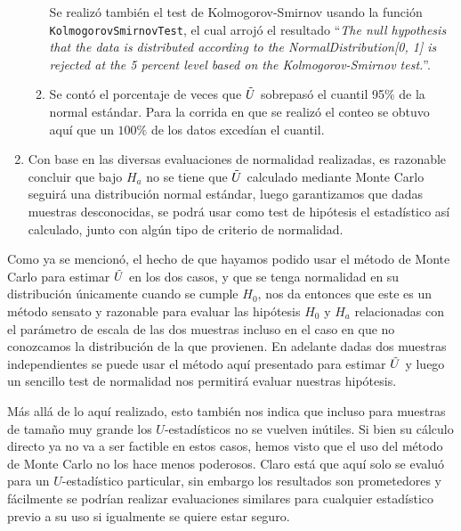 \documentclass[letter]{article}
\begin{document}
\begin{enumerate}
\begin{enumerate}[label=(\roman*)]
Se realizó también el test de Kolmogorov-Smirnov usando la función \texttt{KolmogorovSmirnovTest}, el cual arrojó el resultado ``\emph{The null hypothesis that the data is distributed according to the NormalDistribution[0, 1] is rejected at the 5 percent level based on the Kolmogorov-Smirnov test.}''.

\item Se contó el porcentaje de veces que $\Tilde{U}$ sobrepasó el cuantil 95\% de la normal estándar. Para la corrida en que se realizó el conteo se obtuvo aquí que un $100\%$ de los datos excedían el cuantil.

\end{enumerate}

\item Con base en las diversas evaluaciones de normalidad realizadas, es razonable concluir que bajo $H_a$ no se tiene que $\Tilde{U}$ calculado mediante Monte Carlo seguirá una distribución normal estándar, luego garantizamos que dadas muestras desconocidas, se podrá usar como test de hipótesis el estadístico así calculado, junto con algún tipo de criterio de normalidad.

\end{enumerate}

Como ya se mencionó, el hecho de que hayamos podido usar el método de Monte Carlo para estimar $\Tilde{U}$ en los dos casos, y que se tenga normalidad en su distribución únicamente cuando se cumple $H_0$, nos da entonces que este es un método sensato y razonable para evaluar las hipótesis $H_0$ y $H_a$ relacionadas con el parámetro de escala de las dos muestras incluso en el caso en que no conozcamos la distribución de la que provienen. En adelante dadas dos muestras independientes se puede usar el método aquí presentado para estimar $\Tilde{U}$ y luego un sencillo test de normalidad nos permitirá evaluar nuestras hipótesis.

Más allá de lo aquí realizado, esto también nos indica que incluso para muestras de tamaño muy grande los $U$-estadísticos no se vuelven inútiles. Si bien su cálculo directo ya no va a ser factible en estos casos, hemos visto que el uso del método de Monte Carlo no los hace menos poderosos. Claro está que aquí solo se evaluó para un $U$-estadístico particular, sin embargo los resultados son prometedores y fácilmente se podrían realizar evaluaciones similares para cualquier estadístico previo a su uso si igualmente se quiere estar seguro.



\end{document}

